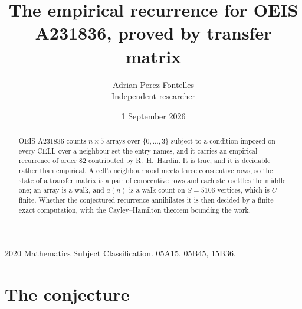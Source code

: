 \documentclass[11pt,a4paper]{article}
\title{The empirical recurrence for OEIS A231836, proved by transfer matrix}
\author{Adrian Perez Fontelles\\ \small Independent researcher}
\date{1 September 2026}
\theoremstyle{plain}
\theoremstyle{definition}
\begin{document}
\maketitle

\begin{abstract}
OEIS A231836 counts $n\times5$ arrays over $\{0,\dots,3\}$ subject to a condition imposed on
every CELL over a neighbour set the entry names, and it carries an empirical recurrence of
order $82$ contributed by R.~H.~Hardin. It is true, and it is decidable rather than
empirical. A cell's neighbourhood meets three consecutive rows, so the state of a transfer
matrix is a pair of consecutive rows and each step settles the middle one; an array is a
walk, and $a(n)$ is a walk count on $S=5106$ vertices, which is $C$-finite. Whether the
conjectured recurrence annihilates it is then decided by a finite exact computation, with the
Cayley--Hamilton theorem bounding the work.
\end{abstract}

\noindent\small 2020 Mathematics Subject Classification. 05A15, 05B45, 15B36.\normalsize

\section{The conjecture}
\end{document}
